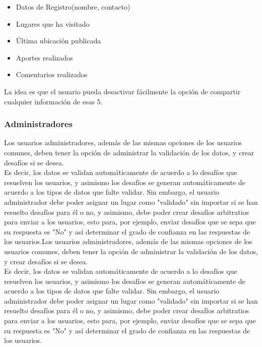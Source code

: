 \documentclass[10pt,letterpaper]{article}
\begin{document}
\begin{itemize}
 \item Datos de Registro(nombre, contacto)
 \item Lugares que ha visitado
 \item Última ubicación publicada
 \item Aportes realizados
 \item Comentarios realizados
\end{itemize}

La idea es que el usuario pueda desactivar fácilmente la opción de compartir cualquier información de esas 5.\\

\subsubsection{Administradores}

Los usuarios administradores, además de las mismas opciones de los usuarios comunes, deben tener la opción de administrar la validación de los datos, y crear desafíos si se desea.\\

Es decir, los datos se validan automáticamente de acuerdo a lo desafíos que resuelven los usuarios, y asimismo los desafíos se generan automáticamente de acuerdo a los tipos de datos que falte validar. Sin embargo, el usuario administrador debe poder asignar un lugar como "validado" sin importar si se han resuelto desafíos para él o no, y asimismo, debe poder crear desafíos arbitratios para enviar a los usuarios, esto para, por ejemplo, enviar desafíos que se sepa que su respuesta es "No" y así determinar el grado de confianza en las respuestas de los usuarios.Los usuarios administradores, además de las mismas opciones de los usuarios comunes, deben tener la opción de administrar la validación de los datos, y crear desafíos si se desea.\\

Es decir, los datos se validan automáticamente de acuerdo a lo desafíos que resuelven los usuarios, y asimismo los desafíos se generan automáticamente de acuerdo a los tipos de datos que falte validar. Sin embargo, el usuario administrador debe poder asignar un lugar como "validado" sin importar si se han resuelto desafíos para él o no, y asimismo, debe poder crear desafíos arbitratios para enviar a los usuarios, esto para, por ejemplo, enviar desafíos que se sepa que su respuesta es "No" y así determinar el grado de confianza en las respuestas de los usuarios.\\
\end{document}
